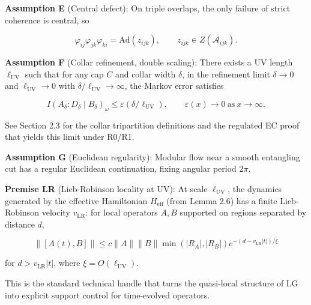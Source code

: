 \documentclass[
]{article}
\begin{document}
\textbf{Assumption E} (Central defect): On triple overlaps, the only
failure of strict coherence is central, so

\[
\varphi_{ij} \varphi_{jk} \varphi_{ki} = \mathrm{Ad}(z_{ijk}),\qquad z_{ijk} \in Z(\mathcal{A}_{ijk}).
\]

\textbf{Assumption F} (Collar refinement, double scaling): There exists
a UV length \(\ell_{\mathrm{UV}}\) such that for any cap \(C\) and
collar width \(\delta\), in the refinement limit \(\delta \to 0\) and
\(\ell_{\mathrm{UV}} \to 0\) with
\(\delta/\ell_{\mathrm{UV}} \to \infty\), the Markov error satisfies

\[
I(A_\delta:D_\delta \mid B_\delta)_\omega \le \varepsilon(\delta/\ell_{\mathrm{UV}}),
\qquad \varepsilon(x) \to 0 \ \text{as} \ x \to \infty.
\]

See Section 2.3 for the collar tripartition definitions and the
regulated EC proof that yields this limit under R0/R1.

\textbf{Assumption G} (Euclidean regularity): Modular flow near a smooth
entangling cut has a regular Euclidean continuation, fixing angular
period \(2\pi\).

\textbf{Premise LR} (Lieb-Robinson locality at UV): At scale
\(\ell_{\mathrm{UV}}\), the dynamics generated by the effective
Hamiltonian \(H_{\mathrm{eff}}\) (from Lemma 2.6) has a finite
Lieb-Robinson velocity \(v_{\mathrm{LR}}\): for local operators \(A, B\)
supported on regions separated by distance \(d\),

\[
\|[A(t), B]\| \le c \|A\| \|B\| \min(|R_A|, |R_B|) e^{-(d - v_{\mathrm{LR}}|t|)/\xi}
\]

for \(d > v_{\mathrm{LR}}|t|\), where \(\xi = O(\ell_{\mathrm{UV}})\).

This is the standard technical handle that turns the quasi-local
structure of LG into explicit support control for time-evolved
operators.
\end{document}
